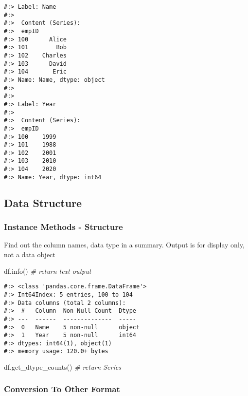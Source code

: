 \documentclass[
]{book}
\newenvironment{Shaded}{\begin{snugshade}}{\end{snugshade}}
\newcommand{\CommentTok}[1]{\textcolor[rgb]{0.37,0.37,0.37}{\textit{#1}}}
\newcommand{\NormalTok}[1]{#1}
\begin{document}
\begin{verbatim}
#:> Label: Name 
#:> 
#:>  Content (Series):
#:>  empID
#:> 100      Alice
#:> 101        Bob
#:> 102    Charles
#:> 103      David
#:> 104       Eric
#:> Name: Name, dtype: object 
#:> 
#:> 
#:> Label: Year 
#:> 
#:>  Content (Series):
#:>  empID
#:> 100    1999
#:> 101    1988
#:> 102    2001
#:> 103    2010
#:> 104    2020
#:> Name: Year, dtype: int64
\end{verbatim}

\hypertarget{data-structure}{%
\subsection{Data Structure}\label{data-structure}}

\hypertarget{instance-methods---structure}{%
\subsubsection{Instance Methods - Structure}\label{instance-methods---structure}}

Find out the column names, data type in a summary. Output is for display only, not a data object

\begin{Shaded}
\begin{Highlighting}[]
\NormalTok{df.info()  }\CommentTok{\# return text output}
\end{Highlighting}
\end{Shaded}

\begin{verbatim}
#:> <class 'pandas.core.frame.DataFrame'>
#:> Int64Index: 5 entries, 100 to 104
#:> Data columns (total 2 columns):
#:>  #   Column  Non-Null Count  Dtype 
#:> ---  ------  --------------  ----- 
#:>  0   Name    5 non-null      object
#:>  1   Year    5 non-null      int64 
#:> dtypes: int64(1), object(1)
#:> memory usage: 120.0+ bytes
\end{verbatim}

\begin{Shaded}
\begin{Highlighting}[]
\NormalTok{df.get\_dtype\_counts() }\CommentTok{\# return Series}
\end{Highlighting}
\end{Shaded}

\hypertarget{conversion-to-other-format}{%
\subsubsection{Conversion To Other Format}\label{conversion-to-other-format}}
\end{document}
